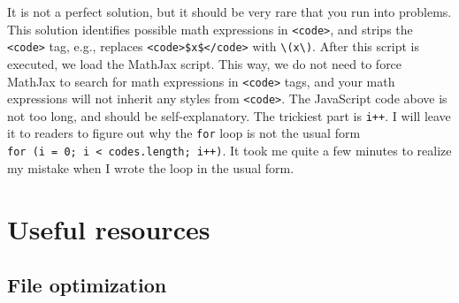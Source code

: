 \documentclass[12pt,]{krantz}
\makeatletter
\newenvironment{Shaded}{\begin{snugshade}}{\end{snugshade}}
\newcommand{\AttributeTok}[1]{\textcolor[rgb]{0.77,0.63,0.00}{#1}}
\newcommand{\CommentTok}[1]{\textcolor[rgb]{0.56,0.35,0.01}{\textit{#1}}}
\newcommand{\ControlFlowTok}[1]{\textcolor[rgb]{0.13,0.29,0.53}{\textbf{#1}}}
\newcommand{\NormalTok}[1]{#1}
\newcommand{\OperatorTok}[1]{\textcolor[rgb]{0.81,0.36,0.00}{\textbf{#1}}}
\newcommand{\SpecialCharTok}[1]{\textcolor[rgb]{0.00,0.00,0.00}{#1}}
\newcommand{\SpecialStringTok}[1]{\textcolor[rgb]{0.31,0.60,0.02}{#1}}
\newcommand{\VariableTok}[1]{\textcolor[rgb]{0.00,0.00,0.00}{#1}}
\newenvironment{kframe}{%
\medskip{}
\setlength{\fboxsep}{.8em}
 \def\at@end@of@kframe{}%
 \ifinner\ifhmode%
  \def\at@end@of@kframe{\end{minipage}}%
  \begin{minipage}{\columnwidth}%
 \fi\fi%
 \def\FrameCommand##1{\hskip\@totalleftmargin \hskip-\fboxsep
 \colorbox{shadecolor}{##1}\hskip-\fboxsep
     \hskip-\linewidth \hskip-\@totalleftmargin \hskip\columnwidth}%
 \MakeFramed {\advance\hsize-\width
   \@totalleftmargin\z@ \linewidth\hsize
   \@setminipage}}%
 {\par\unskip\endMakeFramed%
 \at@end@of@kframe}
\renewenvironment{Shaded}{\begin{kframe}}{\end{kframe}}
\theoremstyle{definition}
\theoremstyle{definition}
\theoremstyle{definition}
\theoremstyle{remark}
\makeatother
\begin{document}
\begin{Shaded}
\end{Shaded}

It is not a perfect solution, but it should be very rare that you run
into problems. This solution identifies possible math expressions in
\texttt{\textless{}code\textgreater{}}, and strips the
\texttt{\textless{}code\textgreater{}} tag, e.g., replaces
\texttt{\textless{}code\textgreater{}\$x\$\textless{}/code\textgreater{}}
with \texttt{\textbackslash{}(x\textbackslash{})}. After this script is
executed, we load the MathJax script. This way, we do not need to force
MathJax to search for math expressions in
\texttt{\textless{}code\textgreater{}} tags, and your math expressions
will not inherit any styles from \texttt{\textless{}code\textgreater{}}.
The JavaScript code above is not too long, and should be
self-explanatory. The trickiest part is \texttt{i++}. I will leave it to
readers to figure out why the \texttt{for} loop is not the usual form
\texttt{for\ (i\ =\ 0;\ i\ \textless{}\ codes.length;\ i++)}. It took me
quite a few minutes to realize my mistake when I wrote the loop in the
usual form.

\hypertarget{useful-resources}{%
\section{Useful resources}\label{useful-resources}}

\hypertarget{file-optimization}{%
\subsection{File optimization}\label{file-optimization}}
\end{document}
